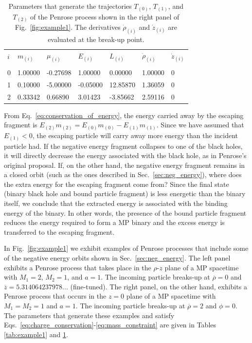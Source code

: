 \renewcommand{\arraystretch}{1.2}
\begin{table}[!htbp]

    \begin{tabular}{lllllll}
        $i$ & $m_{(i)}$ & $\mu_{(i)}$ & $E_{(i)}$ & $L_{(i)}$ & $\dot{\rho}_{(i)}$ & $\dot{z}_{(i)}$ \\ \vspace{-0.3cm} \\
        0   & 1.00000   & -0.27698    & 1.00000   & 0.00000   & 1.00000            & 0               \\
        1   & 0.10000   & -5.00000    & -0.05000  & 12.85870  & 1.36059            & 0               \\
        2   & 0.33342   & 0.66890     & 3.01423   & -3.85662  & 2.59116            & 0               \\
    \end{tabular}

    \caption{Parameters that generate the trajectories $T_{(0)}$, $T_{(1)}$, and $T_{(2)}$ of the Penrose process shown in the right panel of Fig.~\ref{fig:example1}. The derivatives $\dot{\rho}_{(i)}$ and $\dot{z}_{(i)}$ are evaluated at the break-up point.}
    \label{tab:example2}
\end{table}

From Eq.~\eqref{eq:conservation_of_energy}, the energy carried away by the escaping fragment is $E_{(2)}m_{(2)} = E_{(0)}m_{(0)} - E_{(1)}m_{(1)}$. Since we have assumed that $E_{(1)} < 0$, the escaping particle will carry away more energy than the incident particle had. If the negative energy fragment collapses to one of the black holes, it will directly decrease the energy associated with the black hole, as in Penrose's original proposal. If, on the other hand, the negative energy fragment remains in a closed orbit (such as the ones described in Sec.~\ref{sec:neg_energy}), where does the extra energy for the escaping fragment come from? Since the final state (binary black hole and bound particle fragment) is less energetic than the binary itself, we conclude that the extracted energy is associated with the binding energy of the binary. In other words, the presence of the bound particle fragment reduces the energy required to form a MP binary and the excess energy is transferred to the escaping fragment.


In Fig.~\ref{fig:example1} we exhibit examples of Penrose processes that include some of the negative energy orbits shown in Sec.~\ref{sec:neg_energy}. The left panel exhibits a Penrose process that takes place in the $\rho$-$z$ plane of a MP spacetime with $M_1=2$, $M_2=1$, and $a=1$. The incoming particle breaks-up at $\overline \rho=0$ and $\overline z = 5.314064237978...$ (fine-tuned). The right panel, on the other hand,  exhibits a Penrose process that occurs in the $z=0$ plane of a MP spacetime with $M_1=M_2=1$ and $a=1$. The incoming particle breaks-up at $\overline \rho=2$ and $\phi = 0$. The parameters that generate these examples and satisfy Eqs.~\eqref{eq:charge_conservation}-\eqref{eq:mass_constraint} are given in Tables \ref{tab:example1} and \ref{tab:example2}.


